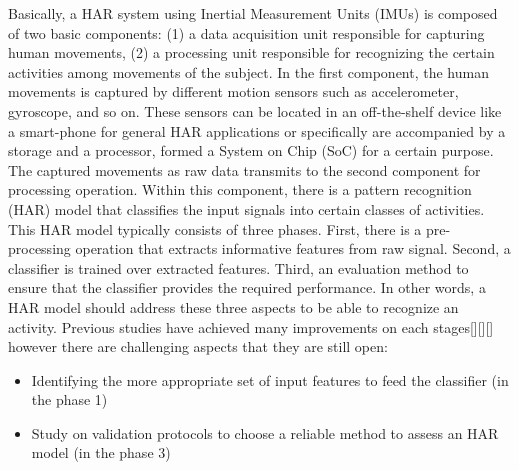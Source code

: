 \documentclass[journal,article,submit,moreauthors,pdftex]{Definitions/mdpi}
\begin{document}
Basically, a HAR system using Inertial Measurement Units (IMUs) is composed of two basic components: (1) a data acquisition unit responsible for capturing human movements, (2) a processing unit responsible for recognizing the certain activities among movements of the subject\cite{rosati2018comparison}. In the first component, the human movements is captured by different motion sensors such as accelerometer, gyroscope, and so on. These sensors can be located in an off-the-shelf device like a smart-phone for general HAR applications or specifically are accompanied by a storage and a processor, formed a System on Chip (SoC) for a certain purpose.\\
The captured movements as raw data transmits to the second component for processing operation. Within this component, there is a pattern recognition (HAR) model that classifies the input signals into certain classes of activities. This HAR model typically consists of three phases. First, there is a pre-processing operation that extracts informative features from raw signal. Second, a classifier is trained over extracted features. Third, an evaluation method to ensure that the classifier provides the required performance\cite{kolodziej2019registration}. In other words, a HAR model should address these three aspects to be able to recognize an activity. Previous studies have achieved many improvements on each stages[][][] however there are challenging aspects that they are still open:
\begin{itemize}[leftmargin=*,labelsep=5.8mm]
	\item	Identifying the more appropriate set of input features to feed the classifier\cite{rosati2018comparison} (in the phase 1)
	\item	Study on validation protocols to choose a reliable method to assess an HAR model \cite{jordao2018human}(in the phase 3)
\end{itemize} 
\end{document}
